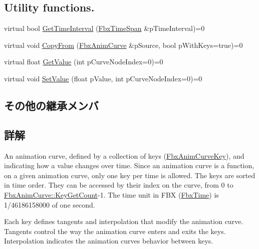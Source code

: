 \subsection*{Utility functions.}
\begin{DoxyCompactItemize}
\item 
virtual bool \hyperlink{class_fbx_anim_curve_aa547431c44acd9eb28aebdec1a142501}{Get\+Time\+Interval} (\hyperlink{class_fbx_time_span}{Fbx\+Time\+Span} \&p\+Time\+Interval)=0
\item 
virtual void \hyperlink{class_fbx_anim_curve_a8e5b647af7ed54b53189fd9488e12f77}{Copy\+From} (\hyperlink{class_fbx_anim_curve}{Fbx\+Anim\+Curve} \&p\+Source, bool p\+With\+Keys=true)=0
\item 
virtual float \hyperlink{class_fbx_anim_curve_ada5c523e08c9a1e4407dfce8697babdc}{Get\+Value} (int p\+Curve\+Node\+Index=0)=0
\item 
virtual void \hyperlink{class_fbx_anim_curve_abcb5d65afda70282d312be4f58b7d9cd}{Set\+Value} (float p\+Value, int p\+Curve\+Node\+Index=0)=0
\end{DoxyCompactItemize}
\subsection*{その他の継承メンバ}


\subsection{詳解}
An animation curve, defined by a collection of keys (\hyperlink{class_fbx_anim_curve_key}{Fbx\+Anim\+Curve\+Key}), and indicating how a value changes over time. Since an animation curve is a function, on a given animation curve, only one key per time is allowed. The keys are sorted in time order. They can be accessed by their index on the curve, from 0 to \hyperlink{class_fbx_anim_curve_a08de74d6ef6469be37abd1df0836eac9}{Fbx\+Anim\+Curve\+::\+Key\+Get\+Count}-\/1. The time unit in F\+BX (\hyperlink{class_fbx_time}{Fbx\+Time}) is 1/46186158000 of one second.

Each key defines tangents and interpolation that modify the animation curve. Tangents control the way the animation curve enters and exits the keys. Interpolation indicates the animation curve\textquotesingle{}s behavior between keys.

